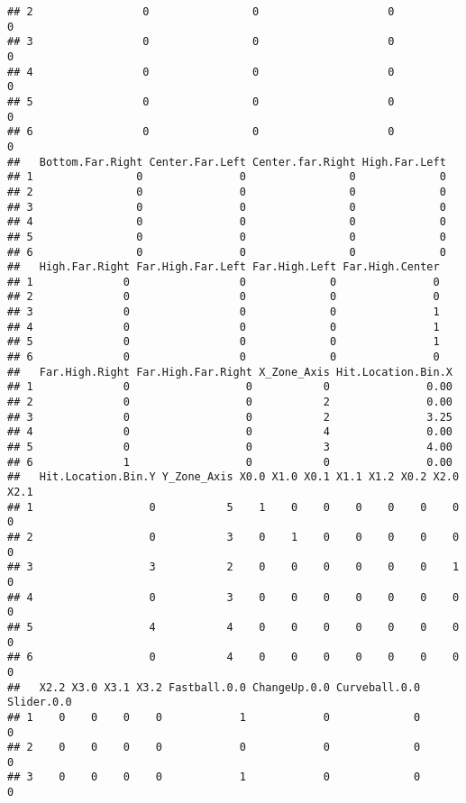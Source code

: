 \documentclass[]{article}
\begin{document}
\begin{verbatim}
## 2                 0                0                    0               0
## 3                 0                0                    0               0
## 4                 0                0                    0               0
## 5                 0                0                    0               0
## 6                 0                0                    0               0
##   Bottom.Far.Right Center.Far.Left Center.far.Right High.Far.Left
## 1                0               0                0             0
## 2                0               0                0             0
## 3                0               0                0             0
## 4                0               0                0             0
## 5                0               0                0             0
## 6                0               0                0             0
##   High.Far.Right Far.High.Far.Left Far.High.Left Far.High.Center
## 1              0                 0             0               0
## 2              0                 0             0               0
## 3              0                 0             0               1
## 4              0                 0             0               1
## 5              0                 0             0               1
## 6              0                 0             0               0
##   Far.High.Right Far.High.Far.Right X_Zone_Axis Hit.Location.Bin.X
## 1              0                  0           0               0.00
## 2              0                  0           2               0.00
## 3              0                  0           2               3.25
## 4              0                  0           4               0.00
## 5              0                  0           3               4.00
## 6              1                  0           0               0.00
##   Hit.Location.Bin.Y Y_Zone_Axis X0.0 X1.0 X0.1 X1.1 X1.2 X0.2 X2.0 X2.1
## 1                  0           5    1    0    0    0    0    0    0    0
## 2                  0           3    0    1    0    0    0    0    0    0
## 3                  3           2    0    0    0    0    0    0    1    0
## 4                  0           3    0    0    0    0    0    0    0    0
## 5                  4           4    0    0    0    0    0    0    0    0
## 6                  0           4    0    0    0    0    0    0    0    0
##   X2.2 X3.0 X3.1 X3.2 Fastball.0.0 ChangeUp.0.0 Curveball.0.0 Slider.0.0
## 1    0    0    0    0            1            0             0          0
## 2    0    0    0    0            0            0             0          0
## 3    0    0    0    0            1            0             0          0

\end{verbatim}
\end{document}
